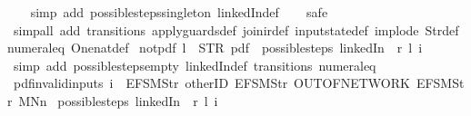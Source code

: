 \begin{isabellebody}
%
\isadelimproof
\ \ %
\endisadelimproof
%
\isatagproof
{}\isamarkupfalse%
\ {\isacharparenleft}simp\ add{\isacharcolon}\ possible{\isacharunderscore}steps{\isacharunderscore}singleton\ linkedIn{\isacharunderscore}def{\isacharparenright}\isanewline
\ \ \isamarkupfalse%
\ safe\isanewline
\ \ \isamarkupfalse%
\ {\isacharparenleft}simp{\isacharunderscore}all\ add{\isacharcolon}\ transitions\ apply{\isacharunderscore}guards{\isacharunderscore}def\ join{\isacharunderscore}ir{\isacharunderscore}def\ input{}state{\isacharunderscore}def\ implode\ Str{\isacharunderscore}def\ numeral{\isacharunderscore}{}{\isacharunderscore}eq{\isacharunderscore}{}\ One{\isacharunderscore}nat{\isacharunderscore}def{\isacharparenright}%
\endisatagproof
{\isafoldproof}%
%
\isadelimproof
\isanewline
%
\endisadelimproof
\isanewline
{}\isamarkupfalse%
\ not{\isacharunderscore}pdf{\isacharunderscore}{}{\isacharcolon}\ {\isachardoublequoteopen}l\ {\isasymnoteq}\ STR\ {\isacharprime}{\isacharprime}pdf{\isacharprime}{\isacharprime}\ {\isasymLongrightarrow}\ possible{\isacharunderscore}steps\ linkedIn\ {}\ r\ l\ i\ {\isacharequal}\ {\isacharbraceleft}{\isacharbar}{\isacharbar}{\isacharbraceright}{\isachardoublequoteclose}\isanewline
%
\isadelimproof
\ \ %
\endisadelimproof
%
\isatagproof
{}\isamarkupfalse%
\ {\isacharparenleft}simp\ add{\isacharcolon}\ possible{\isacharunderscore}steps{\isacharunderscore}empty\ linkedIn{\isacharunderscore}def\ transitions\ numeral{\isacharunderscore}{}{\isacharunderscore}eq{\isacharunderscore}{}{\isacharparenright}%
\endisatagproof
{\isafoldproof}%
%
\isadelimproof
\isanewline
%
\endisadelimproof
\isanewline
{}\isamarkupfalse%
\ pdf{\isacharunderscore}{}{\isacharunderscore}invalid{\isacharunderscore}inputs{\isacharcolon}\ {\isachardoublequoteopen}i\ {\isasymnoteq}\ {\isacharbrackleft}EFSM{\isachardot}Str\ {\isacharprime}{\isacharprime}otherID{\isacharprime}{\isacharprime}{\isacharcomma}\ EFSM{\isachardot}Str\ {\isacharprime}{\isacharprime}OUT{\isacharunderscore}OF{\isacharunderscore}NETWORK{\isacharprime}{\isacharprime}{\isacharcomma}\ EFSM{\isachardot}Str\ {\isacharprime}{\isacharprime}MNn{}{\isacharprime}{\isacharprime}{\isacharbrackright}\ {\isasymLongrightarrow}\isanewline
possible{\isacharunderscore}steps\ linkedIn\ {}\ r\ l\ i\ {\isacharequal}\ {\isacharbraceleft}{\isacharbar}{\isacharbar}{\isacharbraceright}{\isachardoublequoteclose}\isanewline

\end{isabellebody}
